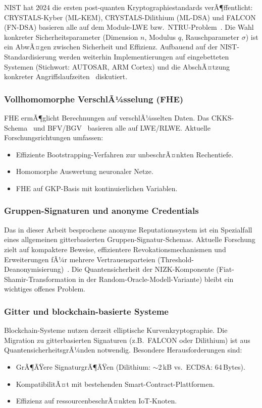 ﻿\documentclass[a4paper,12pt]{article}
\theoremstyle{definition}
\begin{document}
NIST hat 2024 die ersten post-quanten Kryptographiestandards verÃ¶ffentlicht:
CRYSTALS-Kyber (ML-KEM), CRYSTALS-Dilithium (ML-DSA) und FALCON (FN-DSA)
basieren alle auf dem Module-LWE bzw.\ NTRU-Problem~\cite{NIST2024}.
Die Wahl konkreter Sicherheitsparameter (Dimension $n$, Modulus $q$, Rauschparameter $\sigma$)
ist ein AbwÃ¤gen zwischen Sicherheit und Effizienz.
Aufbauend auf der NIST-Standardisierung werden weiterhin Implementierungen
auf eingebetteten Systemen (Stichwort: AUTOSAR, ARM Cortex)
und die AbschÃ¤tzung konkreter Angriffslaufzeiten~\cite{Bai2021} diskutiert.

\subsubsection{Vollhomomorphe VerschlÃ¼sselung (FHE)}

FHE ermÃ¶glicht Berechnungen auf verschlÃ¼sselten Daten.
Das CKKS-Schema~\cite{CKKS2017} und BFV/BGV~\cite{BFV2012} basieren alle auf LWE/RLWE.
Aktuelle Forschungsrichtungen umfassen:
\begin{itemize}
    \item Effiziente Bootstrapping-Verfahren zur unbeschrÃ¤nkten Rechentiefe.
    \item Homomorphe Auswertung neuronaler Netze.
    \item FHE auf GKP-Basis mit kontinuierlichen Variablen.
\end{itemize}

\subsubsection{Gruppen-Signaturen und anonyme Credentials}

Das in dieser Arbeit besprochene anonyme Reputationssystem ist ein Spezialfall
eines allgemeinen gitterbasierten Gruppen-Signatur-Schemas.
Aktuelle Forschung zielt auf kompaktere Beweise, effizientere Revokationsmechanismen
und Erweiterungen fÃ¼r mehrere Vertrauensparteien (Threshold-Deanonymisierung)~\cite{Lyubashevsky2022}.
Die Quantensicherheit der NIZK-Komponente (Fiat-Shamir-Transformation in der
Random-Oracle-Modell-Variante) bleibt ein wichtiges offenes Problem.

\subsubsection{Gitter und blockchain-basierte Systeme}

Blockchain-Systeme nutzen derzeit elliptische Kurvenkryptographie.
Die Migration zu gitterbasierten Signaturen (z.B.\ FALCON oder Dilithium) ist
aus QuantensicherheitsgrÃ¼nden notwendig.
Besondere Herausforderungen sind:
\begin{itemize}
    \item GrÃ¶ÃŸere SignaturgrÃ¶ÃŸen (Dilithium: $\sim$2\,kB vs.\ ECDSA: 64\,Bytes).
    \item KompatibilitÃ¤t mit bestehenden Smart-Contract-Plattformen.
    \item Effizienz auf ressourcenbeschrÃ¤nkten IoT-Knoten.
\end{itemize}
\end{document}

